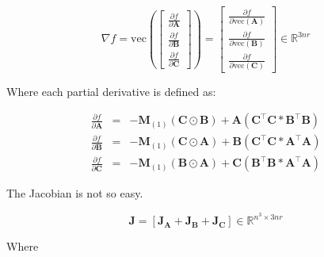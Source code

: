     \begin{equation} \label{eq:cp_dgn_gradient}
        \nabla f = \text{vec}
        \left(
        \left[
        \begin{array}{c}
            \frac{\partial f}{\partial \mathbf{A}} \\
            \frac{\partial f}{\partial \mathbf{B}} \\
            \frac{\partial f}{\partial \mathbf{C}}
        \end{array}
        \right]
        \right) = 
        \left[
            \begin{array}{c}
                \frac{\partial f}{\partial \text{vec}(\mathbf{A})} \\
                \frac{\partial f}{\partial \text{vec}(\mathbf{B})} \\
                \frac{\partial f}{\partial \text{vec}(\mathbf{C})}
            \end{array}
        \right]
        \in \mathbb{R}^{3nr}
    \end{equation}

    Where each partial derivative is defined as:

    \begin{equation}
        \begin{array}{rcl}
            \frac{\partial f}{\partial \mathbf{A}} & = & -\mathbf{M}_{(1)}(\mathbf{C\odot B}) + \mathbf{A(C^\intercal C\ast B^\intercal B)} \\ 
            \frac{\partial f}{\partial \mathbf{B}} & = & -\mathbf{M}_{(1)}(\mathbf{C\odot A}) + \mathbf{B(C^\intercal C\ast A^\intercal A)} \\ 
            \frac{\partial f}{\partial \mathbf{C}} & = & -\mathbf{M}_{(1)}(\mathbf{B\odot A}) + \mathbf{C(B^\intercal B\ast A^\intercal A)} 
        \end{array}
        \label{eq:cp_dgn_partials}
    \end{equation}
    
    The Jacobian is not so easy. 
    
    \begin{equation} \label{eq:cp_dgn_jacobian}
        \mathbf{J} = [\mathbf{J}_\mathbf{A} + \mathbf{J}_\mathbf{B} + \mathbf{J}_\mathbf{C}] \in \mathbb{R}^{n^3\times 3nr}
    \end{equation}
    
    Where
    
